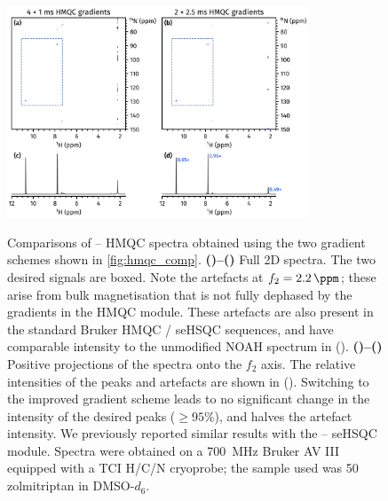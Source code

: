 \documentclass[a4paper,11pt]{article}
\newcommand{\proton}{\ch{^{1}H}}
\newcommand{\nitrogen}{\ch{^{15}N}}
\newcommand{\HN}{\proton{}--\nitrogen{}}
\newcommand*{\zolmi}{Spectra were obtained on a \SI{700}{\MHz} Bruker AV III equipped with a TCI H/C/N cryoprobe; the sample used was \SI{50}{\milli\molar} zolmitriptan in DMSO-\(d_6\).}
\begin{document}
\begin{refsection}
\begin{figure}[H]
    \centering
    \includegraphics[width=0.8\textwidth]{hmqc_comp_snr.png}
    {\label{fig:hmqc_comp_snr_bad2d}}
    {\label{fig:hmqc_comp_snr_good2d}}
    {\label{fig:hmqc_comp_snr_bad1d}}
    {\label{fig:hmqc_comp_snr_good1d}}
    \caption{
        Comparisons of \HN{} HMQC spectra obtained using the two gradient schemes shown in \cref{fig:hmqc_comp}.
        \textbf{()--()} Full 2D spectra.
        The two desired signals are boxed.
        Note the artefacts at \(f_2 = \SI{2.2}{\ppm}\); these arise from bulk magnetisation that is not fully dephased by the gradients in the HMQC module.\autocite{Yong2021JMR}
        These artefacts are also present in the standard Bruker HMQC / seHSQC sequences, and have comparable intensity to the unmodified NOAH spectrum in (\textbf{}).
        \textbf{()--()} Positive projections of the spectra onto the \(f_2\) axis.
        The relative intensities of the peaks and artefacts are shown in ().
        Switching to the improved gradient scheme leads to no significant change in the intensity of the desired peaks (\(\geq 95\%\)), and halves the artefact intensity.
        We previously reported similar results with the \HN{} seHSQC module.\autocite{Yong2021JMR}
        \zolmi{}
    }
    \label{fig:hmqc_comp_snr}
\end{figure}

\printbibliography{}
\end{refsection}
\end{document}
